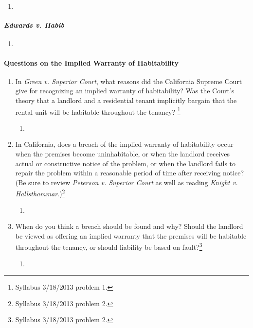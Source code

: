 \begin{enumerate}
    \item %
\end{enumerate}

\paragraph{\emph{Edwards v. Habib}}

\begin{enumerate}
    \item %
\end{enumerate}

\paragraph{Questions on the Implied Warranty of Habitability}

\begin{enumerate}
    \item In \emph{Green v. Superior Court}, what reasons did the California 
    Supreme Court give for recognizing an implied warranty of habitability?  
    Was the Court's theory that a landlord and a residential tenant implicitly 
    bargain that the rental unit will be habitable throughout the tenancy?  
    \footnote{Syllabus 3/18/2013 problem 1.}
    \begin{enumerate}
        \item %
    \end{enumerate}
    \item In California, does a breach of the implied warranty of habitability 
    occur when the premises become uninhabitable, or when the landlord 
    receives actual or constructive notice of the problem, or when the 
    landlord fails to repair the problem within a reasonable period of time 
    after receiving notice? (Be sure to review \emph{Peterson v. Superior 
    Court} as well as reading \emph{Knight v. 
    Hallsthammar}.)\footnote{Syllabus 3/18/2013 problem 2.}
    \begin{enumerate}
        \item %
    \end{enumerate}
    \item When do you think a breach should be found and why?  Should the 
    landlord be viewed as offering an implied warranty that the premises will 
    be habitable throughout the tenancy, or should liability be based on 
    fault?\footnote{Syllabus 3/18/2013 problem 2.}
    \begin{enumerate}
        \item %
    \end{enumerate}
\end{enumerate}

